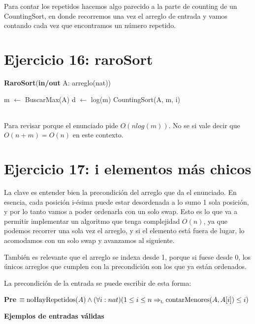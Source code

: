 Para contar los repetidos hacemos algo parecido a la parte de counting de un CountingSort, en donde recorremos una vez el arreglo de entrada y vamos contando cada vez que encontramos un número repetido.

\section{Ejercicio 16: raroSort}

\begin{algorithm}[H]
\caption{
    \textbf{RaroSort}(\textbf{in/out} A: arreglo(nat))
}
\begin{algorithmic}[1]
    \State m $\gets$ BuscarMax(A) 
    \State d $\gets$ log(m) 
     
        \State CountingSort(A, m, i) 
    \EndFor
\end{algorithmic}
 \\
Para revisar porque el enunciado pide $O(n log(m))$. No se si vale decir que $O(n+m) = O(n)$ en este contexto.
\end{algorithm}

\section{Ejercicio 17: i elementos más chicos}

La clave es entender bien la precondición del arreglo que da el enunciado. En esencia, cada posición i-ésima puede estar desordenada a lo sumo 1 sola posición, y por lo tanto vamos a poder ordenarla con un solo swap. Esto es lo que va a permitir implementar un algoritmo que tenga complejidad $O(n)$, ya que podemos recorrer una sola vez el arreglo, y si el elemento está fuera de lugar, lo acomodamos con un solo swap y avanzamos al siguiente.

También es relevante que el arreglo se indexa desde 1, porque si fuese desde 0, los únicos arreglos que cumplen con la precondición son los que ya están ordenados.

La precondición de la entrada se puede escribir de esta forma:

\textbf{Pre} $\equiv \text{noHayRepetidos}(A) \land (\forall i: nat)(1 \leq i \leq n \Rightarrow_{\mathrm{\scriptscriptstyle{L}}} \text{contarMenores}(A, A[i]) \leq i)$

\textbf{Ejemplos de entradas válidas}

